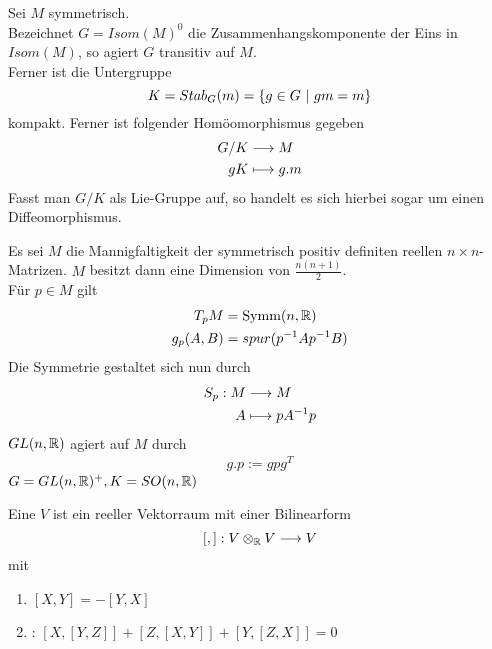 \documentclass{book}
\renewcommand{\i}{^{-1}}
\begin{document}
\Kor{}
Sei $M$ symmetrisch.\\
Bezeichnet $G = Isom(M)^0$ die Zusammenhangskomponente der Eins in $Isom(M)$, so agiert $G$ transitiv auf $M$.\\
Ferner ist die Untergruppe
\[ K = Stab_G(m) = \set{g \in G}{gm = m} \]
kompakt. Ferner ist folgender Homöomorphismus gegeben
\begin{align*}
G / K &\overset{}{\longrightarrow} M\\
gK &\longmapsto g.m
\end{align*}
Fasst man $G/K$ als Lie-Gruppe auf, so handelt es sich hierbei sogar um einen Diffeomorphismus.

\Bsp{}
Es sei $M$ die Mannigfaltigkeit der symmetrisch positiv definiten reellen $n\times n$-Matrizen. $M$ besitzt dann eine Dimension von $\frac{n(n+1)}{2}$.\\
Für $p \in M$ gilt
\begin{align*}
T_pM &= \text{Symm}(n,\R)\\
g_p(A,B) &=spur(p\i A p\i B)
\end{align*}
Die Symmetrie gestaltet sich nun durch
\begin{align*}
S_p : M &\Pfeil{} M\\
A &\longmapsto pA\i p
\end{align*}
$GL(n,\mathbb{R})$ agiert auf $M$ durch
\begin{align*}
g.p := gpg^T
\end{align*}
$G = GL(n,\mathbb{R})^+, K = SO(n,\mathbb{R})$

\Def{}
Eine  $V$ ist ein reeller Vektorraum mit einer Bilinearform
\[ [,] : V\otimes_{\mathbb{R}} V \overset{}{\longrightarrow} V \]
mit
\begin{enumerate}[1.)]
\item $[X,Y] = -[Y,X]$
\item {}: $[X,[Y,Z]] + [Z,[X,Y]] + [Y,[Z,X]] = 0$
\end{enumerate}
\end{document}
